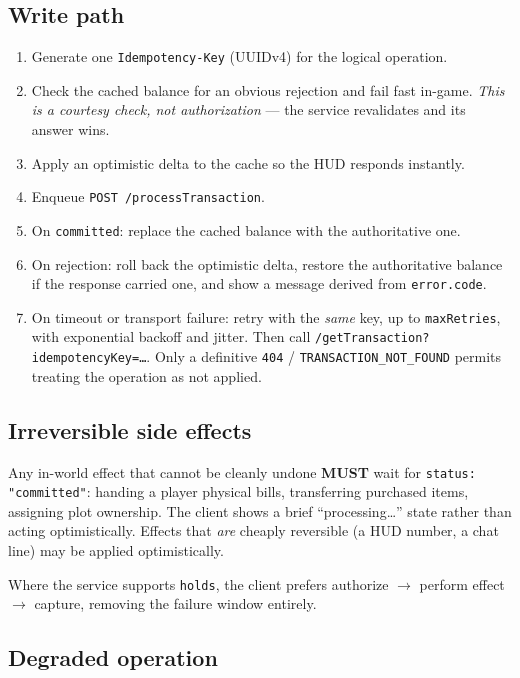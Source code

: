 \documentclass[11pt,a4paper]{article}
\newcommand{\code}[1]{\texttt{\small #1}}
\newcommand{\req}{\textbf{MUST}}
\begin{document}
\subsection{Write path}

\begin{enumerate}
\item Generate one \code{Idempotency-Key} (UUIDv4) for the logical operation.
\item Check the cached balance for an obvious rejection and fail fast in-game. \emph{This is a
      courtesy check, not authorization} --- the service revalidates and its answer wins.
\item Apply an optimistic delta to the cache so the HUD responds instantly.
\item Enqueue \code{POST /processTransaction}.
\item On \code{committed}: replace the cached balance with the authoritative one.
\item On rejection: roll back the optimistic delta, restore the authoritative balance if the
      response carried one, and show a message derived from \code{error.code}.
\item On timeout or transport failure: retry with the \emph{same} key, up to \code{maxRetries},
      with exponential backoff and jitter. Then call
      \code{/getTransaction?idempotencyKey=\ldots}. Only a definitive \code{404} /
      \code{TRANSACTION\_NOT\_FOUND} permits treating the operation as not applied.
\end{enumerate}

\subsection{Irreversible side effects}

Any in-world effect that cannot be cleanly undone \req{} wait for \code{status: "committed"}:
handing a player physical bills, transferring purchased items, assigning plot ownership. The client
shows a brief ``processing\ldots'' state rather than acting optimistically. Effects that \emph{are}
cheaply reversible (a HUD number, a chat line) may be applied optimistically.

Where the service supports \code{holds}, the client prefers authorize $\to$ perform effect $\to$
capture, removing the failure window entirely.

\subsection{Degraded operation}
\end{document}
